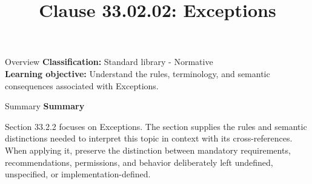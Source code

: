 \documentclass[10pt,letterpaper]{article}
\title{Clause 33.02.02: Exceptions}
\author{}
\date{}
\begin{document}
\maketitle
\begin{CornellOverviewBox}{Overview}
\textbf{Classification:} Standard library - Normative\\[2pt]
\textbf{Learning objective:} Understand the rules, terminology, and semantic consequences associated with Exceptions.
\end{CornellOverviewBox}\begin{CornellSummaryBox}{Summary}
{\sffamily\bfseries\color{Accent} Summary}\par\vspace{3pt}Section 33.2.2 focuses on Exceptions. The section supplies the rules and semantic distinctions needed to interpret this topic in context with its cross-references. When applying it, preserve the distinction between mandatory requirements, recommendations, permissions, and behavior deliberately left undefined, unspecified, or implementation-defined.
\end{CornellSummaryBox}
\end{document}
